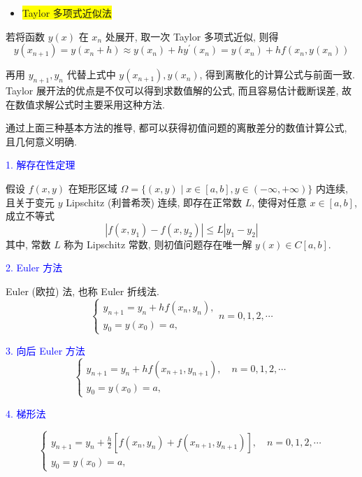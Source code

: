 \begin{itemize}
    \item \colorbox{yellow}{Taylor 多项式近似法}
\end{itemize}


若将函数 $ y(x) $ 在 $ x_{n} $ 处展开, 取一次 Taylor 多项式近似, 则得
$$
y\left(x_{n+1}\right)=y\left(x_{n}+h\right) \approx y\left(x_{n}\right)+h y^{\prime}\left(x_{n}\right)=y\left(x_{n}\right)+h f\left(x_{n}, y\left(x_{n}\right)\right)
$$

再用 $ y_{n+1}, y_{n} $ 代替上式中 $ y\left(x_{n+1}\right), y\left(x_{n}\right) $, 得到离散化的计算公式与前面一致. Taylor 展开法的优点是不仅可以得到求数值解的公式, 而且容易估计截断误差, 故在数值求解公式时主要采用这种方法.

通过上面三种基本方法的推导, 都可以获得初值问题的离散差分的数值计算公式, 且几何意义明确.

\textcolor{blue}{1. 解存在性定理}

假设 $ f(x, y) $ 在矩形区域 $ \Omega=\{(x, y) \mid x \in[a, b], y \in(-\infty,+\infty)\} $ 内连续, 且关于变元 $ y $ Lipschitz (利普希茨) 连续, 即存在正常数 $ L $, 使得对任意 $ x \in[a, b] $, 成立不等式
$$
\left|f\left(x, y_{1}\right)-f\left(x, y_{2}\right)\right| \leqslant L\left|y_{1}-y_{2}\right|
$$
其中, 常数 $ L $ 称为 Lipschitz 常数, 则初值问题存在唯一解 $ y(x) \in C[a, b] $.

\textcolor{blue}{2. Euler 方法}

Euler (欧拉) 法, 也称 Euler 折线法.
$$
\left\{\begin{array}{l}
y_{n+1}=y_{n}+h f\left(x_{n}, y_{n}\right), \\
y_{0}=y\left(x_{0}\right)=a,
\end{array} n=0,1,2, \cdots\right.
$$

\textcolor{blue}{3. 向后 Euler 方法}
$$
\left\{\begin{array}{l}
y_{n+1}=y_{n}+h f\left(x_{n+1}, y_{n+1}\right), \quad n=0,1,2, \cdots \\
y_{0}=y\left(x_{0}\right)=a,
\end{array}\right.
$$

\textcolor{blue}{4. 梯形法}

$$ \left\{\begin{array}{l}y_{n+1}=y_{n}+\frac{h}{2}\left[f\left(x_{n}, y_{n}\right)+f\left(x_{n+1}, y_{n+1}\right)\right], \quad n=0,1,2, \cdots \\ y_{0}=y\left(x_{0}\right)=a,\end{array}\right. $$

